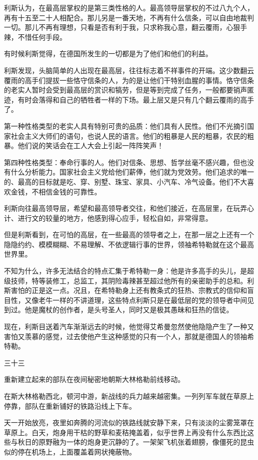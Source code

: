 利斯认为，在最高层掌权的是第三类性格的人。最高领导层掌权的不过八九个人，再有十五至二十人相配合。那儿另是一番天地，不再有什么信条，可以自由地裁判一切。那儿不再有理想，只看是否有利于我，只求称我心意，翻云覆雨，心狠手辣，不惜任何手段。

有时候利斯觉得，在德国所发生的一切都是为了他们和他们的利益。

利斯发现，头脑简单的人出现在最高层，往往标志着不祥事件的开端。这少数翻云覆雨的高手们提拔一些恪守信条的人，为的是让他们干特别血腥的事情。恪守信条的老实人暂时会受到最高层的赏识和犒劳，但是等到完成了任务，一般都要销声匿迹，有时会落得和自己的牺牲者一样的下场。最上层又是只有几个翻云覆雨的高手了。

第一种性格类型的老实人具有特别可贵的品质：他们具有人民性。他们不光摘引国家社会主义大师们的语句，也说人民的语言。他们的粗暴是人民的粗暴，农民的粗暴。他们说的笑话会在工人大会上引起一阵阵笑声！

第四种性格类型：奉命行事的人。他们对信条、思想、哲学丝毫不感兴趣，但也没有什么分析能力。国家社会主义党给他们薪俸，他们就为党效劳。他们追求的唯一的、最高的目标就是吃、穿、别墅、珠宝、家具、小汽车、冷气设备。他们不大喜欢金钱，不相信金钱的可靠性。

利斯向往最高领导层，希望和最高领导者交往，和他们接近，在高层里，在玩弄心计、进行文的较量的地方，他感到得心应手，轻松自如，非常得意。

但是利斯看到，在可怕的高层，在一些最高的领导者之上，在那一层之上还有一个隐隐约约、模模糊糊、不易理解、不依逻辑行事的世界，领袖希特勒就在这个最高世界里。

不知为什么，许多无法结合的特点汇集于希特勒一身：他是许多高手的头儿，是超级技师，特等装修工，总监工，其阴险毒辣甚至超过他所有的亲密助手的总和。利斯害怕的正是这一点。况且，在希特勒身上还有教条式的狂热、宗教式的信仰和盲目性，又像老牛一样的不讲道理，这些特点利斯只是在最低层的党的领导者中间见到过。他是魔杖的创作者，是头号圣人，同时又是极其愚昧和狂热的信徒。

现在，利斯目送着汽车渐渐远去的时候，他觉得艾希曼忽然使他隐隐产生了一种又害怕又羡慕的感觉，过去使他产生这种感觉的只有一个人，那就是德国人的领袖希特勒。

三十三

重新建立起来的部队在夜间秘密地朝斯大林格勒前线移动。

在斯大林格勒西北，顿河中游，新战线的兵力越来越密集。一列列军车就在草原上停靠，部队在重新铺好的铁路沿线上下车。

天一开始放亮，夜里如奔腾的河流似的铁路线就安静下来，只有淡淡的尘雾笼罩在草原上。白天，炮身用干枯的野草和麦秸掩盖着，似乎世界上再没有什么东西比这些与秋日的原野融为一体的炮身更沉静的了。一架架飞机张着翅膀，像僵死的昆虫似的停在机场上，上面覆盖着网状掩蔽物。

